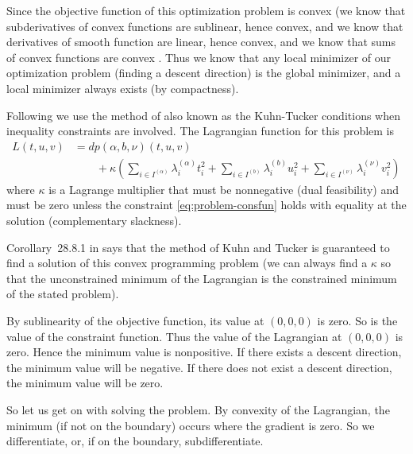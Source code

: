 Since the objective function of this optimization problem is convex
(we know that subderivatives of convex functions are sublinear, hence convex,
and we know that derivatives of smooth function are linear, hence convex,
and we know that sums of convex functions are convex
\citep[Exercise~2.18]{rockafellar-wets}.  Thus we know that any local minimizer
of our optimization problem (finding a descent direction) is the global
minimizer, and a local minimizer always exists (by compactness).

Following \citet{reaster-tr,reaster} we use the method of
also known as the Kuhn-Tucker conditions when inequality constraints
are involved.  The Lagrangian function for this problem is
\begin{equation} \label{eq:problem-lagrangian}
\begin{split}
   L(t, u, v) & = d p(\alpha, b, \nu)(t, u, v)
   \\
   & \qquad
   + \kappa \left( \sum_{i \in I^{(\alpha)}} \lambda^{(\alpha)}_i t_i^2
   + \sum_{i \in I^{(b)}} \lambda^{(b)}_i u_i^2
   + \sum_{i \in I^{(\nu)}} \lambda^{(\nu)}_i v_i^2 \right)
\end{split}
\end{equation}
where $\kappa$ is a Lagrange multiplier that must be nonnegative
(dual feasibility) and must be zero unless the constraint
\eqref{eq:problem-consfun} holds with equality at the solution
(complementary slackness).

Corollary~{28.8.1} in \citet{rockafellar} says that the method
of Kuhn and Tucker is guaranteed to find a solution of this convex programming
problem (we can always find a $\kappa$ so that the unconstrained minimum of
the Lagrangian is the constrained minimum of the stated problem).

By sublinearity of the objective function, its value at $(0, 0, 0)$ is
zero.  So is the value of the constraint function.  Thus the value of
the Lagrangian at $(0, 0, 0)$ is zero.  Hence the minimum value is nonpositive.
If there exists a descent direction, the minimum value will be negative.
If there does not exist a descent direction, the minimum value will be zero.

So let us get on with solving the problem.  By convexity of the Lagrangian,
the minimum (if not on the boundary) occurs where the gradient is zero.
So we differentiate, or, if on the boundary, subdifferentiate.

